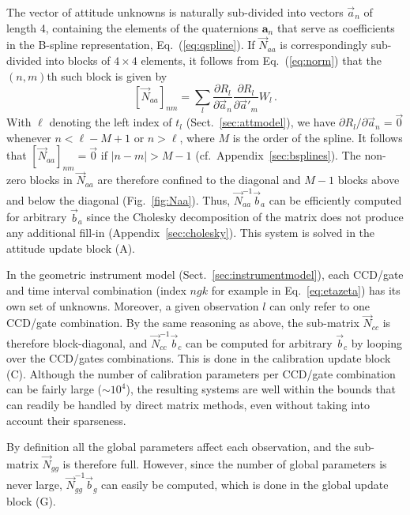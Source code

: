 \documentclass[structabstract]{aa}
\newcommand{\quat}[1]{\mathbf{#1}}
\begin{document}
The vector of attitude unknowns is naturally sub-divided into vectors
$\vec{a}_n$ of length 4, containing the elements of the quaternions
$\quat{a}_n$ that serve as coefficients in the B-spline representation,
Eq.~(\ref{eq:qspline}). If $\vec{N}_{aa}$ is correspondingly sub-divided
into blocks of $4\times 4$ elements, it follows from Eq.~(\ref{eq:norm})
that the $(n,m)$th such block is given by
\begin{equation}\label{eq:Naa}
\left[\vec{N}_{aa}\right]_{nm} = \sum_l
\frac{\partial R_l}{\partial\vec{a}_n}\frac{\partial R_l}{\partial\vec{a}'_{m}}
W_l \, .
\end{equation}
With $\ell$ denoting the left index of $t_l$ (Sect.~\ref{sec:attmodel}), we
have $\partial R_l/\partial\vec{a}_n=\vec{0}$ whenever $n<\ell-M+1$ or $n>\ell$,
where $M$ is the order of the spline. It follows that
$\left[\vec{N}_{aa}\right]_{nm}=\vec{0}$ if $|n-m|>M-1$
(cf.\ Appendix~\ref{sec:bsplines}). The non-zero blocks in $\vec{N}_{aa}$
are therefore confined to the diagonal and $M-1$ blocks above and below the
diagonal (Fig.~\ref{fig:Naa}). 
Thus, $\vec{N}_{aa}^{-1}\vec{b}_a$ can be efficiently computed for
arbitrary $\vec{b}_a$ since the Cholesky decomposition of the matrix
does not produce any additional fill-in (Appendix~\ref{sec:cholesky}).
This system is solved in the attitude update block (A).

In the geometric instrument model (Sect.~\ref{sec:instrumentmodel}), each
CCD/gate and time interval combination (index $ngk$ for example in Eq.~\ref{eq:etazeta}) has
its own set of unknowns. Moreover, a given observation $l$ can only refer
to one CCD/gate combination. By the same reasoning as above, the sub-matrix
$\vec{N}_{cc}$ is therefore block-diagonal, and $\vec{N}_{cc}^{-1}\vec{b}_c$
can be computed for arbitrary $\vec{b}_c$ by looping over the CCD/gates
combinations. This is done in the calibration update block (C).
Although the number of calibration parameters per CCD/gate combination can
be fairly large ($\sim\!10^4$), the resulting systems are well within the
bounds that can readily be handled by direct matrix methods, even without
taking into account their sparseness.

By definition all the global parameters affect each observation, and
the sub-matrix $\vec{N}_{gg}$ is therefore full. However, since the number
of global parameters is never large, $\vec{N}_{gg}^{-1}\vec{b}_g$ can
easily be computed, which is done in the global update block (G).
\end{document}
